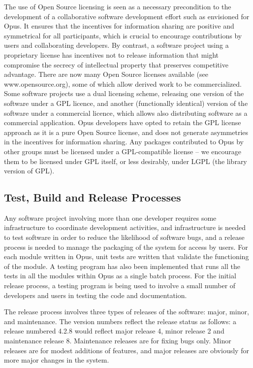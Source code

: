 The use of Open Source licensing is seen as a necessary precondition to the development of a collaborative software development effort such as envisioned for Opus.  It ensures that the incentives for information sharing are positive and symmetrical for all participants, which is crucial to encourage contributions by users and collaborating developers.  By contrast, a software project using a proprietary license has incentives not to release information that might compromise the secrecy of intellectual property that preserves competitive advantage. 
There are now many Open Source licenses available (see www.opensource.org), some of which allow derived work to be commercialized.  Some software projects use a dual licensing scheme, releasing one version of the software under a GPL licence, and another (functionally identical) version of the software under a commercial licence, which allows also distributing software as a commercial application.  Opus developers have opted to retain the GPL license approach as it is a pure Open Source license, and does not generate asymmetries in the incentives for information sharing. Any packages contributed to Opus by other groups must be licensed under a GPL-compatible license – we encourage them to be licensed under GPL itself, or less desirably, under LGPL (the library version of GPL).

\subsection{Test, Build and Release Processes}
Any software project involving more than one developer requires some infrastructure to coordinate development activities, and infrastructure is needed to test software in order to reduce the likelihood of software bugs, and a release process is needed to manage the packaging of the system for access by users.  For each module written in Opus, unit tests are written that validate the functioning of the module. A testing program has also been implemented that runs all the tests in all the modules within Opus as a single batch process.  
For the initial release process, a testing program is being used to involve a small number of developers and users in testing the code and documentation.  

The release process involves three types of releases of the software: major, minor, and maintenance. The version numbers reflect the release status as follows: a release numbered 4.2.8 would reflect major release 4, minor release 2 and maintenance release 8.  Maintenance releases are for fixing bugs only.  Minor releases are for modest additions of features, and major releases are obviously for more major changes in the system.

